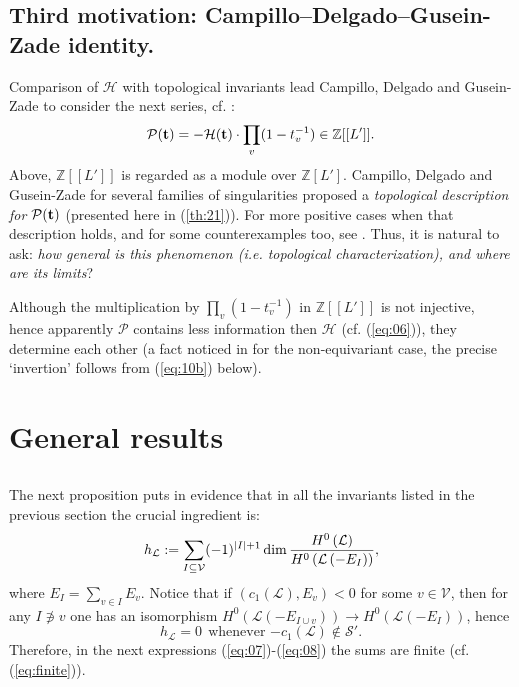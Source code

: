 \documentclass[10pt,a4paper]{amsart}
\numberwithin{equation}{section}
\numberwithin{equation}{subsection}
\theoremstyle{plain}
\theoremstyle{definition}
\providecommand{\coloneqq}{\mathrel{:=}}
\begin{document}
\subsection{Third motivation: Campillo--Delgado--Gusein-Zade
identity.}\label{TM} Comparison of ${\mathcal{H}}$ with topological
invariants lead Campillo, Delgado and Gusein-Zade to consider the
next series, cf. \cite{CDG,CDGEq}:
\begin{equation}\label{eq:06}
{\mathcal{P}}({{\bf t}})=-{\mathcal{H}}({{\bf t}}) \cdot \prod_v(1-t_v^{-1})\in {\mathbb{Z}}[[L']].
\end{equation}
Above, ${\mathbb{Z}}[[L']]$ is regarded as a module over  ${\mathbb{Z}}[L']$.
Campillo, Delgado and Gusein-Zade for several families of
singularities proposed a {\em topological description for
${\mathcal{P}}({{\bf t}})$} (presented here in (\ref{th:21})). For
more positive cases when that description holds, and for some
counterexamples too, see \cite{CDGb}. Thus, it is natural to ask:
{\em how general is this phenomenon (i.e. topological
characterization), and where are its limits}?

Although the multiplication by   $\prod_v(1-t_v^{-1})$ in
${\mathbb{Z}}[[L']]$ is not injective, hence apparently ${\mathcal{P}}$ contains
less information then ${\mathcal{H}}$ (cf. (\ref{eq:06})), they determine
each other (a fact noticed in \cite{CDG} for the non-equivariant
case, the precise `invertion' follows from (\ref{eq:10b}) below).

\section{General results}\label{s:general}

\subsection{}
The next proposition puts in evidence that in all the
invariants listed in the previous section the crucial ingredient
is:
\begin{equation}
  \label{eq:1}
  h_{\mathcal{L}} \coloneqq \sum_{I \subseteq {\mathcal{V}}}
(-1)^{\left\lvert I \right\rvert + 1}
  \dim {\mathchoice
         \frac{{H^0 \left( {\mathcal{L}} \right)}}{{H^0 \left( {\mathcal{L}} \left( -E_I\right)
  \right)}}   
  {\mathinner{{{H^0 \left( {\mathcal{L}} \right)}}/{{H^0 \left( {\mathcal{L}} \left( -E_I\right)
  \right)}}}}
  {\mathinner{{{H^0 \left( {\mathcal{L}} \right)}}/{{H^0 \left( {\mathcal{L}} \left( -E_I\right)
  \right)}}}}
  {\mathinner{{{H^0 \left( {\mathcal{L}} \right)}}/{{H^0 \left( {\mathcal{L}} \left( -E_I\right)
  \right)}}}}
},
\end{equation}
where \(E_I=\sum_{v \in I} E_v\). Notice that  if \((c_1({\mathcal{L}}),E_v)
< 0\) for some
$v\in{\mathcal{V}}$,  then for any \(I\not\ni v\) one has an isomorphism
\(H^0({\mathcal{L}}(-E_{I\cup
v}))\to H^0({\mathcal{L}}(-E_I))\), hence
\begin{equation}\label{eq:1b}
h_{\mathcal{L}}=0 \ \ \mbox{whenever \ $-c_1({\mathcal{L}})\not\in{\mathcal{S}}'$.}
\end{equation}
Therefore, in the next expressions (\ref{eq:07})-(\ref{eq:08}) the
sums are finite (cf. (\ref{eq:finite})).
\end{document}
